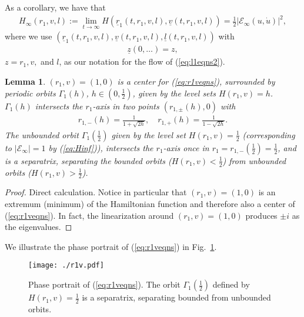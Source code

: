 \documentclass[reqno,12pt]{amsart}
\newcommand{\eqlab}[1]{\label{eq:#1}}
\renewcommand{\eqref}[1]{(\ref{eq:#1})}
\newcommand{\figref}[1]{Fig.~\ref{fig:#1}}
\newcommand{\figlab}[1]{\label{fig:#1}}
\newcommand{\lemmalab}[1]{\label{lemma:#1}}
\newtheorem{lemma}[theorem]{Lemma}
\numberwithin{equation}{section}
\begin{document}
As a corollary, we have that 
\begin{align}
 H_\infty(r_1,v,l):=\lim_{t\rightarrow \infty}  H(\underline r_1(t,r_1,v,l),\underline v(t,r_1,v,l)) = \frac12\vert \mathcal E_\infty(u,\dot u)\vert^2,\eqlab{Hinf}
\end{align}
where we use $(\underline r_1(t,r_1,v,l),\underline v(t,r_1,v,l),\underline l(t,r_1,v,l))$ with
\begin{align*}
\underline z(0,\ldots)=z,
\end{align*}
 $z=r_1,v,$ and $l$, as our notation
for the flow of \eqref{l1eqns2}.



\begin{lemma}\lemmalab{Ham}
$(r_1,v)=(1,0)$ is a center for \eqref{r1veqns}, surrounded by periodic orbits $\Gamma_1(h)$, $h\in \left(0,\frac12\right)$, given by the level sets $H(r_1,v)=h$. $\Gamma_1(h)$  intersects the $r_1$-axis in two points $(r_{1,\pm}(h),0)$ with
\begin{align*}
r_{1,-}(h) = \frac{1}{1+\sqrt{2h}},\quad r_{1,+}(h) = \frac{1}{1-\sqrt{2h}}.
\end{align*}
The unbounded orbit $\Gamma_1\!\left(\frac12\right)$ given by the level set $H(r_1,v)=\frac12$ (corresponding to $\vert \mathcal E_\infty\vert=1$ by \eqref{Hinf}), intersects the $r_1$-axis once in $r_1=r_{1,-}(\frac12) =\frac12$, and is a separatrix, separating the bounded orbits ($H(r_1,v)<\frac12$) from unbounded orbits ($H(r_1,v)>\frac12$).
\end{lemma}
\begin{proof}
 Direct calculation. Notice in particular that $(r_1,v)=(1,0)$ is an extremum (minimum) of the Hamiltonian function and therefore also a center of \eqref{r1veqns}. In fact, the linearization around $(r_1,v)=(1,0)$ produces $\pm i$ as the eigenvalues.
\end{proof}
We illustrate the phase portrait of \eqref{r1veqns} in \figref{r1v}. 


\begin{figure}[h!]
 	\begin{center}
 		{\texttt{[image: ./r1v.pdf]}}
 		\caption{Phase portrait of \eqref{r1veqns}. The orbit $\Gamma_1\!\left(\frac12\right)$ defined by $H(r_1,v)=\frac12$ is a separatrix, separating bounded from unbounded orbits.}\figlab{r1v}
 	\end{center}
 \end{figure}
\end{document}

